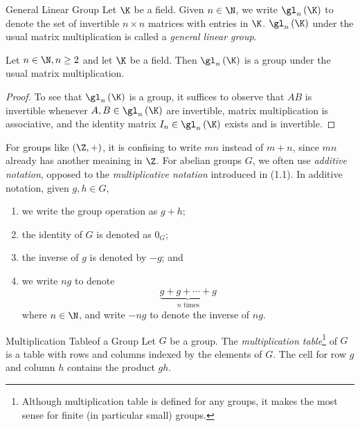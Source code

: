 \documentclass[pmath347]{subfiles}
\begin{document}
    \begin{definition}{General Linear Group}{}
        Let $\K$ be a field. Given $n\in\N$, we write $\gl_n\left( \K \right)$ to denote the set of invertible $n\times n$ matrices with entries in $\K$. $\gl_n\left( \K \right)$ under the usual matrix multiplication is called a \emph{general linear group}.
    \end{definition}
    
    \begin{prop}{}
        Let $n\in\N,n\geq 2$ and let $\K$ be a field. Then $\gl_n\left( \K \right)$ is a group under the usual matrix multiplication.
    \end{prop}

    \begin{proof}
        To see that $\gl_n\left( \K \right)$ is a group, it suffices to observe that $AB$ is invertible whenever $A,B\in\gl_n\left( \K \right)$ are invertible, matrix multiplication is associative, and the identity matrix $I_n\in\gl_n\left( \K \right)$ exists and is invertible.
    \end{proof}

    For groups like $\left( \Z,+ \right)$, it is confising to write $mn$ instead of $m+n$, since $mn$ already has another meaining in $\Z$. For abelian groups $G$, we often use \textit{additive notation}, opposed to the \textit{multiplicative notation} introduced in (1.1). In additive notation, given $g,h\in G$,
    \begin{enumerate}
        \item we write the group operation as $g+h$;
        \item the identity of $G$ is denoted as $0_G$;
        \item the inverse of $g$ is denoted by $-g$; and
        \item we write $ng$ to denote
            \begin{equation*}
                \underbrace{g+g+\cdots+g}_{n\text{ times}}
            \end{equation*}
            where $n\in\N$, and write $-ng$ to denote the inverse of $ng$.
    \end{enumerate}
    
    \begin{definition}{Multiplication Table}{of a Group}
        Let $G$ be a group. The \emph{multiplication table}\footnote{Although multiplication table is defined for any groups, it makes the most sense for finite (in particular small) groups.} of $G$ is a table with rows and columns indexed by the elements of $G$. The cell for row $g$ and column $h$ contains the product $gh$.
    \end{definition}
\end{document}
